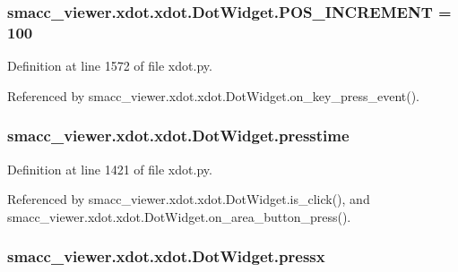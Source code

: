 \subsubsection[{\texorpdfstring{P\+O\+S\+\_\+\+I\+N\+C\+R\+E\+M\+E\+NT}{POS_INCREMENT}}]{ smacc\+\_\+viewer.\+xdot.\+xdot.\+Dot\+Widget.\+P\+O\+S\+\_\+\+I\+N\+C\+R\+E\+M\+E\+NT = 100\hspace{0.3cm}{\ttfamily [static]}}\hypertarget{classsmacc__viewer_1_1xdot_1_1xdot_1_1DotWidget_aab5f33a81f2c7339690f161f6f811577}{}\label{classsmacc__viewer_1_1xdot_1_1xdot_1_1DotWidget_aab5f33a81f2c7339690f161f6f811577}


Definition at line 1572 of file xdot.\+py.



Referenced by smacc\+\_\+viewer.\+xdot.\+xdot.\+Dot\+Widget.\+on\+\_\+key\+\_\+press\+\_\+event().

\subsubsection[{\texorpdfstring{presstime}{presstime}}]{\setlength{\rightskip}{0pt plus 5cm}smacc\+\_\+viewer.\+xdot.\+xdot.\+Dot\+Widget.\+presstime}\hypertarget{classsmacc__viewer_1_1xdot_1_1xdot_1_1DotWidget_a71750fa797569142bc3ab635a7a06b74}{}\label{classsmacc__viewer_1_1xdot_1_1xdot_1_1DotWidget_a71750fa797569142bc3ab635a7a06b74}


Definition at line 1421 of file xdot.\+py.



Referenced by smacc\+\_\+viewer.\+xdot.\+xdot.\+Dot\+Widget.\+is\+\_\+click(), and smacc\+\_\+viewer.\+xdot.\+xdot.\+Dot\+Widget.\+on\+\_\+area\+\_\+button\+\_\+press().

\subsubsection[{\texorpdfstring{pressx}{pressx}}]{\setlength{\rightskip}{0pt plus 5cm}smacc\+\_\+viewer.\+xdot.\+xdot.\+Dot\+Widget.\+pressx}\hypertarget{classsmacc__viewer_1_1xdot_1_1xdot_1_1DotWidget_a6085b280df091fee9dc2aa83ded6b7a9}{}\label{classsmacc__viewer_1_1xdot_1_1xdot_1_1DotWidget_a6085b280df091fee9dc2aa83ded6b7a9}


